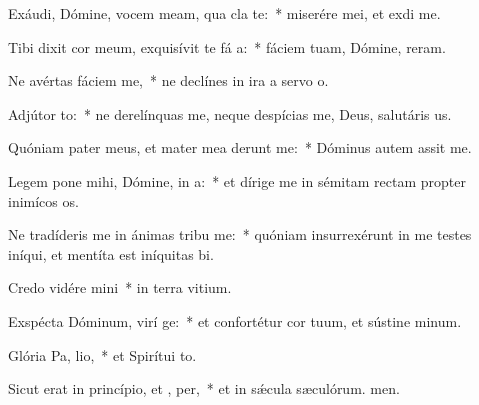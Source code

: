 \item Exáudi, Dómine, vocem meam, qua cla  te:~* miserére mei, et exdi me.
\item Tibi dixit cor meum, exquisívit te fá a:~* fáciem tuam, Dómine, reram.
\item Ne avértas fáciem   me,~* ne declínes in ira a servo o.
\item Adjútor  to:~* ne derelínquas me, neque despícias me, Deus, salutáris us.
\item Quóniam pater meus, et mater mea derunt me:~* Dóminus autem assit me.
\item Legem pone mihi, Dómine, in  a:~* et dírige me in sémitam rectam propter inimícos os.
\item Ne tradíderis me in ánimas tribu me:~* quóniam insurrexérunt in me testes iníqui, et mentíta est iníquitas bi.
\item Credo vidére  mini~* in terra vitium.
\item Exspécta Dóminum, virí ge:~* et confortétur cor tuum, et sústine minum.
\item Glória Pa,  lio,~* et Spirítui to.
\item Sicut erat in princípio, et ,  per,~* et in sǽcula sæculórum. men.
